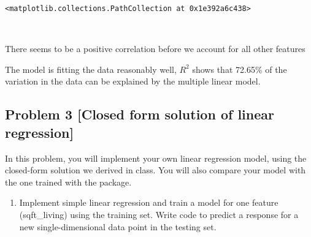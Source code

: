 \documentclass[11pt]{article}
\providecommand{\tightlist}{%
      \setlength{\itemsep}{0pt}\setlength{\parskip}{0pt}}
\begin{document}
    
    \begin{verbatim}
<matplotlib.collections.PathCollection at 0x1e392a6c438>
    \end{verbatim}

    
    \begin{center}
    \end{center}
    { \hspace*{\fill} \\}
    
    There seems to be a positive correlation before we account for all other
features

The model is fitting the data reasonably well, \(R^2\) shows that
72.65\% of the variation in the data can be explained by the multiple
linear model.

    \subsection{Problem 3 {[}Closed form solution of linear
regression{]}}\label{problem-3-closed-form-solution-of-linear-regression}

In this problem, you will implement your own linear regression model,
using the closed-form solution we derived in class. You will also
compare your model with the one trained with the package.

\begin{enumerate}
\def\labelenumi{\arabic{enumi}.}
\tightlist
\item
  Implement simple linear regression and train a model for one feature
  (sqft\_living) using the training set. Write code to predict a
  response for a new single-dimensional data point in the testing set.
\end{enumerate}
\end{document}

